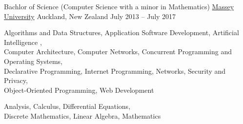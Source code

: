 

\begin{cventries}
	\cventry
	{Bachlor of Science (Computer Science with a minor in Mathematics)}
	{\href{http://www.massey.ac.nz/}{Massey University}}
	{Auckland, \enskip New Zealand}
	{July 2013 – July 2017}
	{
		\begin{cvitems}
		\item		
			{Algorithms and Data Structures},\enskip \enskip 
			{Application Software Development},\enskip \enskip 
			{Artificial Intelligence}	,\enskip \\
			{Computer Architecture},\enskip\enskip  
			{Computer Networks},\enskip\enskip  
			{Concurrent Programming and Operating Systems},\enskip  \\
			{Declarative Programming},\enskip\enskip  
			{Internet Programming},\enskip \enskip 
			{Networks, Security and Privacy},\enskip  \\
			{Object-Oriented Programming},\enskip\enskip  
			{Web Development}\enskip\\
		\item	
			{Analysis},\enskip\enskip  
			{Calculus},\enskip \enskip 
			{Differential Equations},\enskip\\
			{Discrete Mathematics},\enskip\enskip  
			{Linear Algebra},\enskip \enskip 
			{Mathematics }\enskip 
		\end{cvitems}
	}
\end{cventries}

